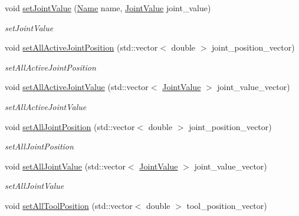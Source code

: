 \begin{DoxyCompactItemize}
void \hyperlink{classrobotis__manipulator_1_1_manipulator_aa740b17551040520851ec8dc1d619bfe}{set\+Joint\+Value} (\hyperlink{namespacerobotis__manipulator_a08c2d25e77a01ad75b9bb740f8ce4765}{Name} name, \hyperlink{namespacerobotis__manipulator_aa0556c98c5294ccf3a96c2d0fe315e40}{Joint\+Value} joint\+\_\+value)
\begin{DoxyCompactList}\small\item\em set\+Joint\+Value \end{DoxyCompactList}\item 
void \hyperlink{classrobotis__manipulator_1_1_manipulator_a5c1a45efe548837cfa8bb51ccc65a757}{set\+All\+Active\+Joint\+Position} (std\+::vector$<$ double $>$ joint\+\_\+position\+\_\+vector)
\begin{DoxyCompactList}\small\item\em set\+All\+Active\+Joint\+Position \end{DoxyCompactList}\item 
void \hyperlink{classrobotis__manipulator_1_1_manipulator_af42c8e7d8b0a1fe505832d632348e804}{set\+All\+Active\+Joint\+Value} (std\+::vector$<$ \hyperlink{namespacerobotis__manipulator_aa0556c98c5294ccf3a96c2d0fe315e40}{Joint\+Value} $>$ joint\+\_\+value\+\_\+vector)
\begin{DoxyCompactList}\small\item\em set\+All\+Active\+Joint\+Value \end{DoxyCompactList}\item 
void \hyperlink{classrobotis__manipulator_1_1_manipulator_a5752ed8828468e7a6f729871ff812205}{set\+All\+Joint\+Position} (std\+::vector$<$ double $>$ joint\+\_\+position\+\_\+vector)
\begin{DoxyCompactList}\small\item\em set\+All\+Joint\+Position \end{DoxyCompactList}\item 
void \hyperlink{classrobotis__manipulator_1_1_manipulator_a383388a3c388fbfc4482f670d5e4ad10}{set\+All\+Joint\+Value} (std\+::vector$<$ \hyperlink{namespacerobotis__manipulator_aa0556c98c5294ccf3a96c2d0fe315e40}{Joint\+Value} $>$ joint\+\_\+value\+\_\+vector)
\begin{DoxyCompactList}\small\item\em set\+All\+Joint\+Value \end{DoxyCompactList}\item 
void \hyperlink{classrobotis__manipulator_1_1_manipulator_a1ef41a8b1c12d416646fd0291f66ea81}{set\+All\+Tool\+Position} (std\+::vector$<$ double $>$ tool\+\_\+position\+\_\+vector)

\end{DoxyCompactItemize}
